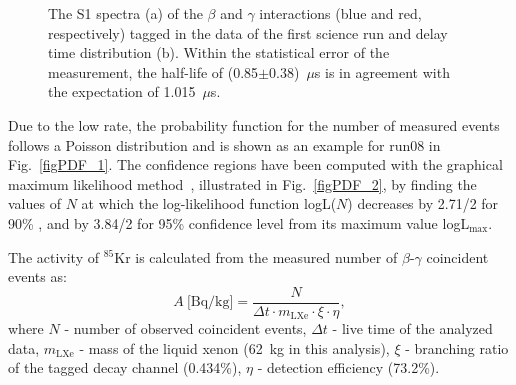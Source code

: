 \begin{figure}[!h]
\centering
{}
\caption[The S1 spectra of the $\beta$ and $\gamma$ interactions tagged in the data of the first science run and delay time distribution]{The S1 spectra (a) of the $\beta$ and $\gamma$ interactions (blue and red, respectively) tagged in the data of the first science run and delay time distribution (b). Within the statistical error of the measurement, the half-life of (0.85$\pm$0.38)~$\mu$s is in agreement with the expectation of 1.015~$\mu$s.}
\label{figDCrun08}
\end{figure}

Due to the low rate, the probability function for the number of measured events follows a Poisson distribution and is shown as an example for run08 in Fig.~\ref{figPDF_1}. The confidence regions have been computed with the graphical maximum likelihood method~\cite{StatisticsCowan},  illustrated in Fig.~\ref{figPDF_2},  by finding the values of $N$ at which the log-likelihood function logL($N$) decreases by 2.71/2 for 90\% , and by 3.84/2 for 95\% confidence level from its maximum value logL$_{\mathrm{max}}$.

The activity of $^{85}$Kr is calculated from the measured number of $\beta$-$\gamma$ coincident events as:
\begin{equation}
A\ \text{[Bq/kg]} = \frac{N}{\Delta t \cdot m_{\mathrm{LXe}} \cdot \xi \cdot \eta},
\end{equation}
where $N$ - number of observed coincident events, $\Delta t$ - live time of the analyzed data, $m_{\mathrm{LXe}}$ - mass of the liquid xenon (62~kg in this analysis), $\xi$ - branching ratio of the tagged decay channel (0.434\%), $\eta$ - detection efficiency (73.2\%).


